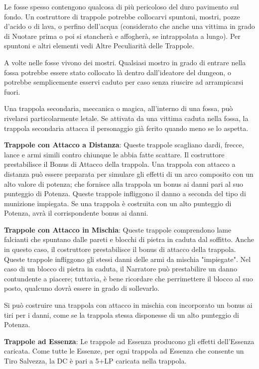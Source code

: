 \documentclass[a4paper,11pt,twoside,openany]{book}
\begin{document}
Le fosse spesso contengono qualcosa di più pericoloso del duro pavimento sul fondo. Un costruttore di trappole potrebbe collocarvi spuntoni, mostri, pozze d'acido o di lava, o perfino dell'acqua (considerato che anche una vittima in grado di Nuotare prima o poi si stancherà e affogherà, se intrappolata a lungo). Per spuntoni e altri elementi vedi Altre Peculiarità delle Trappole.

A volte nelle fosse vivono dei mostri. Qualsiasi mostro in grado di entrare nella fossa potrebbe essere stato collocato là dentro dall'ideatore del dungeon, o potrebbe semplicemente esservi caduto per caso senza riuscire ad arrampicarsi fuori.

Una trappola secondaria, meccanica o magica, all'interno di una fossa, può rivelarsi particolarmente letale. Se attivata da una vittima caduta nella fossa, la trappola secondaria attacca il personaggio già ferito quando meno se lo aspetta.

\textbf{Trappole con Attacco a Distanza}: Queste trappole scagliano dardi, frecce, lance e armi simili contro chiunque le abbia fatte scattare. Il costruttore prestabilisce il Bonus di Attacco della trappola. Una trappola con attacco a distanza può essere preparata per simulare gli effetti di un arco composito con un alto valore di potenza; che fornisce alla trappola un bonus ai danni pari al suo punteggio di Potenza. Queste trappole infliggono il danno a seconda del tipo di munizione impiegata. Se una trappola è costruita con un alto punteggio di Potenza, avrà il corrispondente bonus ai danni.

\textbf{Trappole con Attacco in Mischia}: Queste trappole comprendono lame falcianti che spuntano dalle pareti e blocchi di pietra in caduta dal soffitto. Anche in questo caso, il costruttore prestabilisce il bonus di attacco della trappola. Queste trappole infliggono gli stessi danni delle armi da mischia "impiegate". Nel caso di un blocco di pietra in caduta, il Narratore può prestabilire un danno contundente a piacere; tuttavia, è bene ricordare che perrimettere il blocco al suo posto, qualcuno dovrà essere in grado di sollevarlo.

Si può costruire una trappola con attacco in mischia con incorporato un bonus ai tiri per i danni, come se la trappola stessa disponesse di un alto punteggio di Potenza.

\textbf{Trappole ad Essenza}: Le trappole ad Essenza producono gli effetti dell'Essenza caricata. Come tutte le Essenze, per ogni trappola ad Essenza che consente un Tiro Salvezza, la DC è pari a 5+LP caricata nella trappola.
\end{document}
